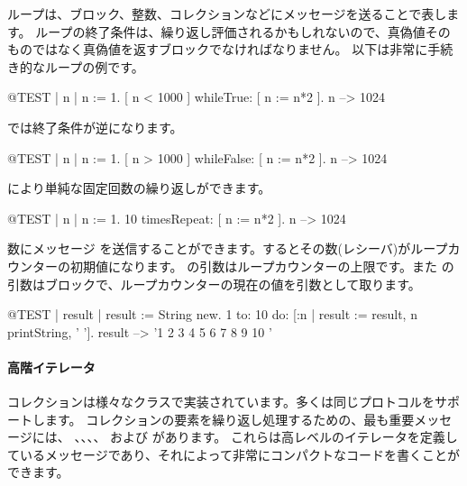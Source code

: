 \documentclass[a4paper,10pt,twoside]{book}
\begin{document}
ループは、ブロック、整数、コレクションなどにメッセージを送ることで表します。
ループの終了条件は、繰り返し評価されるかもしれないので、真偽値そのものではなく真偽値を返すブロックでなければなりません。
以下は非常に手続き的なループの例です。


\begin{code}{@TEST | n |}
n := 1.
[ n < 1000 ] whileTrue: [ n := n*2 ].
n --> 1024
\end{code}

\noindent
{} では終了条件が逆になります。
\begin{code}{@TEST | n |}
n := 1.
[ n > 1000 ] whileFalse: [ n := n*2 ].
n --> 1024
\end{code}

\noindent
{} により単純な固定回数の繰り返しができます。

\begin{code}{@TEST | n |}
n := 1.
10 timesRepeat: [ n := n*2 ].
n --> 1024
\end{code}

数にメッセージ  を送信することができます。するとその数(レシーバ)がループカウンターの初期値になります。
 の引数はループカウンターの上限です。また  の引数はブロックで、ループカウンターの現在の値を引数として取ります。

\begin{code}{@TEST | result |}
result := String new.
1 to: 10 do: [:n | result := result, n printString, ' '].
result --> '1 2 3 4 5 6 7 8 9 10 '
\end{code}


\paragraph{高階イテレータ}
コレクションは様々なクラスで実装されています。多くは同じプロトコルをサポートします。
コレクションの要素を繰り返し処理するための、最も重要メッセージには、
、、、、 および  があります。
これらは高レベルのイテレータを定義しているメッセージであり、それによって非常にコンパクトなコードを書くことができます。
\end{document}
